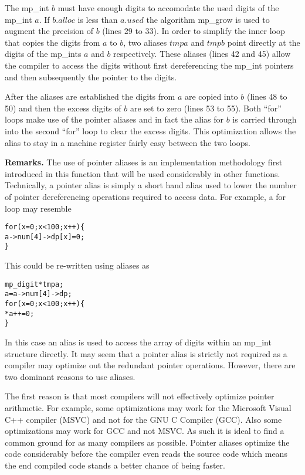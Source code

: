 \documentclass[b5paper]{book}
\begin{document}
The mp\_int $b$ must have enough digits to accomodate the used digits of the mp\_int $a$.  If $b.alloc$ is less than
$a.used$ the algorithm mp\_grow is used to augment the precision of $b$ (lines 29 to 33).  In order to
simplify the inner loop that copies the digits from $a$ to $b$, two aliases $tmpa$ and $tmpb$ point directly at the digits
of the mp\_ints $a$ and $b$ respectively.  These aliases (lines 42 and 45) allow the compiler to access the digits without first dereferencing the
mp\_int pointers and then subsequently the pointer to the digits.  

After the aliases are established the digits from $a$ are copied into $b$ (lines 48 to 50) and then the excess 
digits of $b$ are set to zero (lines 53 to 55).  Both ``for'' loops make use of the pointer aliases and in 
fact the alias for $b$ is carried through into the second ``for'' loop to clear the excess digits.  This optimization 
allows the alias to stay in a machine register fairly easy between the two loops.

\textbf{Remarks.}  The use of pointer aliases is an implementation methodology first introduced in this function that will
be used considerably in other functions.  Technically, a pointer alias is simply a short hand alias used to lower the 
number of pointer dereferencing operations required to access data.  For example, a for loop may resemble

\begin{alltt}
for (x = 0; x < 100; x++) \{
    a->num[4]->dp[x] = 0;
\}
\end{alltt}

This could be re-written using aliases as 

\begin{alltt}
mp_digit *tmpa;
a = a->num[4]->dp;
for (x = 0; x < 100; x++) \{
    *a++ = 0;
\}
\end{alltt}

In this case an alias is used to access the 
array of digits within an mp\_int structure directly.  It may seem that a pointer alias is strictly not required 
as a compiler may optimize out the redundant pointer operations.  However, there are two dominant reasons to use aliases.

The first reason is that most compilers will not effectively optimize pointer arithmetic.  For example, some optimizations 
may work for the Microsoft Visual C++ compiler (MSVC) and not for the GNU C Compiler (GCC).  Also some optimizations may 
work for GCC and not MSVC.  As such it is ideal to find a common ground for as many compilers as possible.  Pointer 
aliases optimize the code considerably before the compiler even reads the source code which means the end compiled code 
stands a better chance of being faster.
\end{document}
